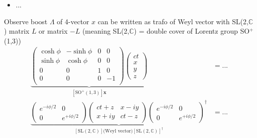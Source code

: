 \documentclass[../main.tex]{subfiles}
\begin{document}
\begin{itemize}
\begin{itemize}
\item ...
\end{itemize}
Observe boost $\Lambda$ of 4-vector $x$ can be written as  trafo of Weyl vector with SL(2,$\mathbb{C}$) matrix $L$ or matrix $-L$ (meaning SL(2,$\mathbb{C}$) = double cover of Lorentz group SO$^{+}$(1,3))
\begin{align}
\underbrace{\left(\begin{matrix}
\cosh\phi & -\sinh\phi & 0 & 0\\
\sinh\phi & \cosh\phi  & 0 & 0\\
0 & 0 & 1 & 0\\
0 & 0 & 0 &-1\\
\end{matrix}\right)
\left(\begin{matrix}
ct\\x\\ y\\z
\end{matrix}\right)}_{[\text{SO}^{+}(1,3)]\mathbf{x}}
&=...\\
\underbrace{\left(\begin{matrix}
e^{-i\phi/2} & 0\\
0 & e^{+i\phi/2}
\end{matrix}
\right)
\left(\begin{matrix}
ct+z & x-iy\\
x+iy & ct-z
\end{matrix}
\right)
\left(\begin{matrix}
e^{-i\phi/2} & 0\\
0 & e^{+i\phi/2}
\end{matrix}
\right)^\dagger}_{[\text{SL}(2,\mathbb{C})]\text{(Weyl vector)}[\text{SL}(2,\mathbb{C})]^\dagger}&=...
\end{align}


\end{itemize}
\end{document}
